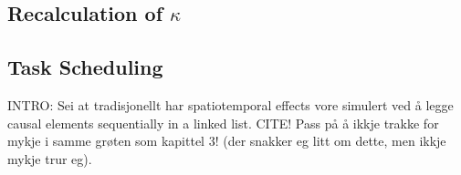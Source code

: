 		\subsection{Recalculation of $\kappa$}
		\subsection{Task Scheduling}
			INTRO: Sei at tradisjonellt har spatiotemporal effects vore simulert ved å legge causal elements sequentially in a linked list. CITE! %
			Pass på å ikkje trakke for mykje i samme grøten som kapittel 3! (der snakker eg litt om dette, men ikkje mykje trur eg).


	
